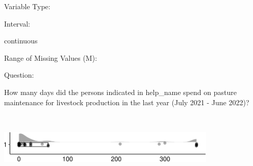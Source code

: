 \documentclass[
]{article}
\begin{document}
\begin{minipage}[t]{0.3\linewidth}

Variable Type:

\end{minipage}%
\begin{minipage}[t]{0.7\linewidth}

\end{minipage}

\begin{minipage}[t]{0.3\linewidth}

Interval:

\end{minipage}%
\begin{minipage}[t]{0.7\linewidth}

continuous

\end{minipage}

\begin{minipage}[t]{0.3\linewidth}

Range of Missing Values (M):

\end{minipage}%
\begin{minipage}[t]{0.7\linewidth}

\end{minipage}

\begin{minipage}[t]{0.3\linewidth}

Question:

\end{minipage}%
\begin{minipage}[t]{0.7\linewidth}

How many days did the persons indicated in help\_name spend on pasture
maintenance for livestock production in the last year (July 2021 - June
2022)?

\end{minipage}

\begin{minipage}[t]{0.3\linewidth}

~

\end{minipage}%
\begin{minipage}[t]{0.7\linewidth}

\includegraphics[width=396px]{codebook_template_files/figure-latex/q7_36_rainplot-1}

\end{minipage}
 \vspace*{-6mm} 
\end{document}
